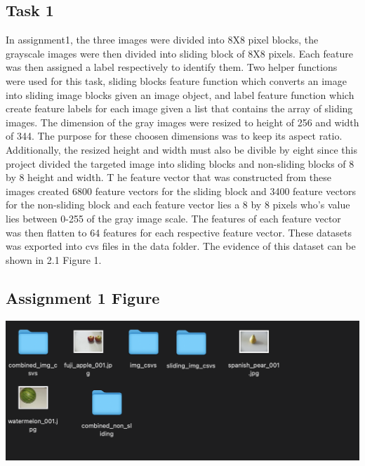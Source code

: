 \documentclass[12pt]{article}
\begin{document}
\begin{multicols*}{2}
  \section{Task 1}
  \hspace*{5mm} In assignment1, the three images were divided into 8X8 pixel blocks, the grayscale images were then divided into sliding block of 8X8 pixels. Each feature was then assigned a label respectively to identify them. 
  Two helper functions were used for this task, sliding blocks feature function which converts an image into sliding image blocks given an image object, and 
  label feature function which create feature labels for each image given a list that contains the array of sliding images. The dimension of the gray images were resized to height of 256 and width of 344. The purpose for these choosen dimensions was to keep its aspect ratio. 
  Additionally, the resized height and width must also be divible by eight since this project divided the targeted image into sliding blocks and non-sliding blocks of 8 by 8 height and width. T
  he feature vector that was constructed from these images created 6800 feature vectors for the sliding block and 3400 feature vectors for the non-sliding block and each feature vector lies a 8 by 8 pixels who’s value lies between 0-255 of the gray image scale. 
  The features of each feature vector was then flatten to 64 features for each respective feature vector. These datasets was exported into cvs files in the data folder.
  The evidence of this dataset can be shown in 2.1 Figure 1. 

  \subsection{Assignment 1 Figure} 
	\begin{center}
		\includegraphics[scale=0.2]{../screenshot/csvs.png}	
    \end{center}



\end{multicols*}
\end{document}
